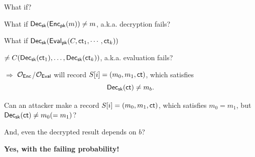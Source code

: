 \documentclass[handout]{beamer}
\begin{document}
    \begin{frame}{What if?}

    What if \textcolor{blue}{${\sf Dec}_{\sf sk}({\sf Enc}_{\sf pk}(m)) \neq m$}, a.k.a. decryption fails?\pause

    What if \textcolor{blue}{${\sf Dec}_{\sf sk}({\sf Eval}_{\sf pk}(C, {\sf ct}_1, \cdots, {\sf ct}_k))$}

    \hfill \textcolor{blue}{$\neq C({\sf Dec}_{\sf sk}({\sf ct}_1), \dots, {\sf Dec}_{\sf sk}({\sf ct}_k))$},
    a.k.a. evaluation fails? \vspace{0.5cm}\pause

    $\Rightarrow$ ${\mathcal O}_{\sf Enc}$/${\mathcal O}_{\sf Eval}$ will record $S[i] = (m_0, m_1, {\sf ct})$, which satisfies 
    \[
        {\sf Dec}_{\sf sk}({\sf ct}) \neq m_b.
    \]\pause

    Can an attacker make a record $S[i] = (m_0, m_1, {\sf ct})$, which satisfies $m_0 = m_1$, but ${\sf Dec}_{\sf sk}({\sf ct}) \neq m_0 (=m_1)$?\vspace{0.3cm}\pause
        
    And, even the decrypted result depends on $b$? 
    \end{frame}

    \begin{frame}{}
    \begin{center}
        {\Large \bf Yes, with the failing probability!}
    \end{center} 
    \end{frame}
    
\end{document}
